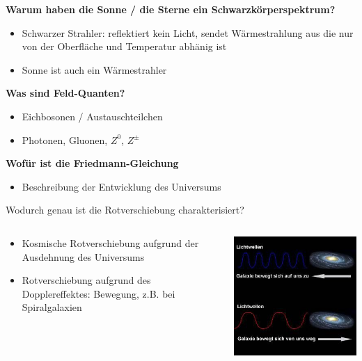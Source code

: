 \begin{frame}{}
  \textbf{Warum haben die Sonne / die Sterne ein Schwarzkörperspektrum?}
  \begin{itemize}
    \item Schwarzer Strahler: reflektiert kein Licht, sendet Wärmestrahlung aus die nur von der Oberfläche und Temperatur abhänig ist
    \item Sonne ist auch ein Wärmestrahler
  \end{itemize}
  \textbf{Was sind Feld-Quanten?}
  \begin{itemize}
    \item Eichbosonen / Austauschteilchen
    \item Photonen, Gluonen, $Z^0$, $Z^\pm$
  \end{itemize}
  \textbf{Wofür ist die Friedmann-Gleichung}
  \begin{itemize}
    \item Beschreibung der Entwicklung des Universums
    \end{itemize}
\end{frame}

\begin{frame}{Wodurch genau ist die Rotverschiebung charakterisiert?}
  \begin{columns}
 \begin{column}{0.5\textwidth}
  \begin{itemize}
    \item Kosmische Rotverschiebung aufgrund der Ausdehnung des Universums
    \item Rotverschiebung aufgrund des Dopplereffektes: Bewegung, z.B. bei Spiralgalaxien
  \end{itemize}
  \end{column}
\begin{column}{0.5\textwidth}
  \includegraphics[width=\textwidth]{images/doppler.jpg}
\end{column}
  \end{columns}
\end{frame}

